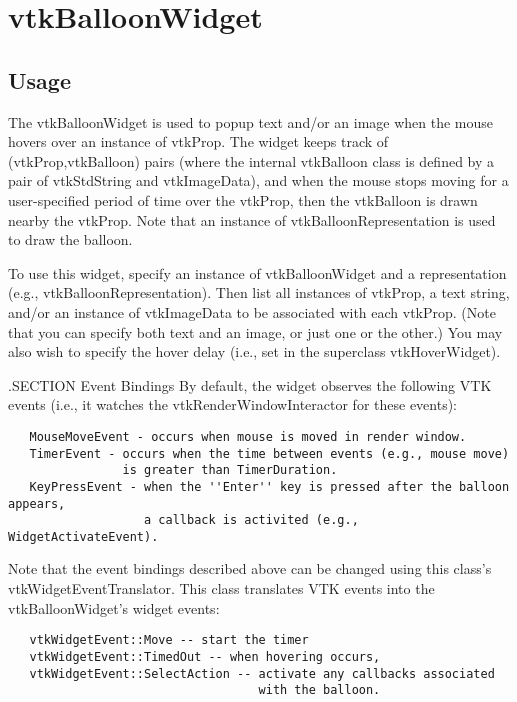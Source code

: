 \section{vtkBalloonWidget}

\subsection{Usage}

 The vtkBalloonWidget is used to popup text and/or an image when the mouse
 hovers over an instance of vtkProp. The widget keeps track of
 (vtkProp,vtkBalloon) pairs (where the internal vtkBalloon class is defined
 by a pair of vtkStdString and vtkImageData), and when the mouse stops
 moving for a user-specified period of time over the vtkProp, then the
 vtkBalloon is drawn nearby the vtkProp. Note that an instance of
 vtkBalloonRepresentation is used to draw the balloon.
 
 To use this widget, specify an instance of vtkBalloonWidget and a
 representation (e.g., vtkBalloonRepresentation). Then list all instances
 of vtkProp, a text string, and/or an instance of vtkImageData to be
 associated with each vtkProp. (Note that you can specify both text and an
 image, or just one or the other.) You may also wish to specify the hover
 delay (i.e., set in the superclass vtkHoverWidget).

 .SECTION Event Bindings
 By default, the widget observes the following VTK events (i.e., it
 watches the vtkRenderWindowInteractor for these events):
 \begin{verbatim}
   MouseMoveEvent - occurs when mouse is moved in render window.
   TimerEvent - occurs when the time between events (e.g., mouse move)
                is greater than TimerDuration.
   KeyPressEvent - when the ''Enter'' key is pressed after the balloon appears,
                   a callback is activited (e.g., WidgetActivateEvent).
 \end{verbatim}

 Note that the event bindings described above can be changed using this
 class's vtkWidgetEventTranslator. This class translates VTK events 
 into the vtkBalloonWidget's widget events:
 \begin{verbatim}
   vtkWidgetEvent::Move -- start the timer
   vtkWidgetEvent::TimedOut -- when hovering occurs,
   vtkWidgetEvent::SelectAction -- activate any callbacks associated 
                                   with the balloon.
 \end{verbatim}

